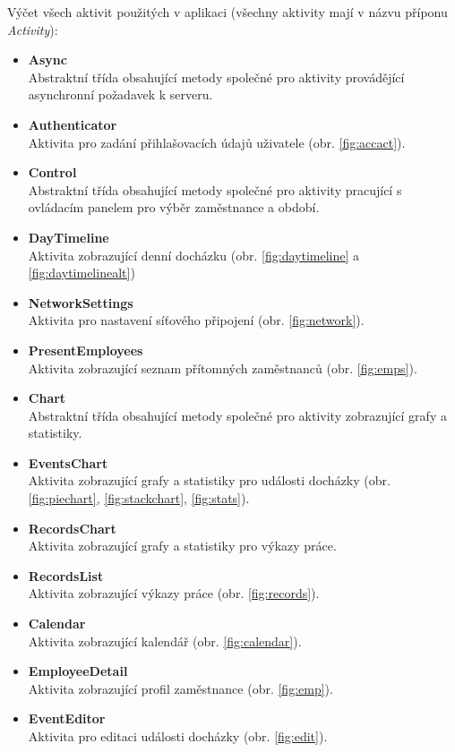 \documentclass{diplomka}
\begin{document}
Výčet všech aktivit použitých v aplikaci (všechny aktivity mají v názvu příponu \emph{Activity}):
\begin{itemize}[noitemsep,nolistsep]
\item \textbf{Async}\\
Abstraktní třída obsahující metody společné pro aktivity provádějící asynchronní požadavek k serveru.
\item \textbf{Authenticator}\\ 
Aktivita pro zadání přihlašovacích údajů uživatele (obr. \ref{fig:accact}).
\item \textbf{Control}\\
Abstraktní třída obsahující metody společné pro aktivity pracující s ovládacím panelem pro výběr zaměstnance a období.
\item \textbf{DayTimeline}\\
Aktivita zobrazující denní docházku (obr. \ref{fig:daytimeline} a \ref{fig:daytimelinealt})
\item \textbf{NetworkSettings}\\ 
Aktivita pro nastavení síťového připojení (obr. \ref{fig:network}).
\item \textbf{PresentEmployees}\\
Aktivita zobrazující seznam přítomných zaměstnanců (obr. \ref{fig:emps}).
\item \textbf{Chart}\\
Abstraktní třída obsahující metody společné pro aktivity zobrazující grafy a statistiky.
\item \textbf{EventsChart}\\
Aktivita zobrazující grafy a statistiky pro události docházky (obr. \ref{fig:piechart}, \ref{fig:stackchart}, \ref{fig:stats}).
\item \textbf{RecordsChart}\\
Aktivita zobrazující grafy a statistiky pro výkazy práce.
\item \textbf{RecordsList}\\
Aktivita zobrazující výkazy práce (obr. \ref{fig:records}).
\item \textbf{Calendar}\\
Aktivita zobrazující kalendář  (obr. \ref{fig:calendar}).
\item \textbf{EmployeeDetail}\\
Aktivita zobrazující profil zaměstnance (obr. \ref{fig:emp}).
\item \textbf{EventEditor}\\
Aktivita pro editaci události docházky (obr. \ref{fig:edit}).

\end{itemize}
\end{document}
